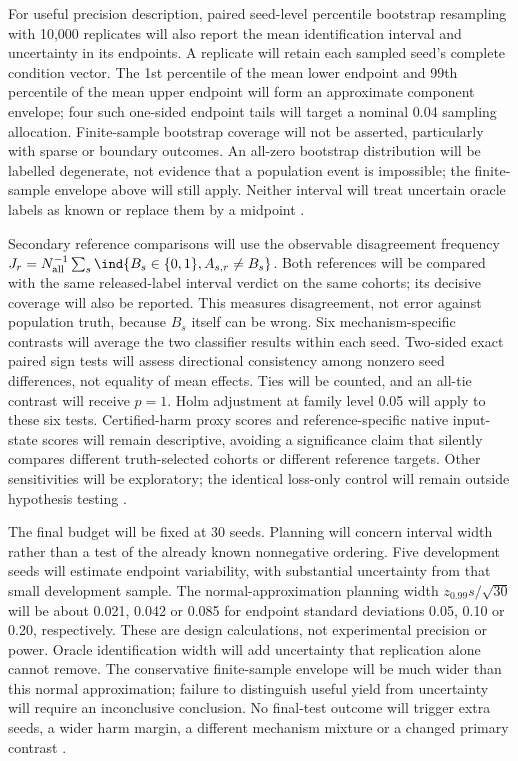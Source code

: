 For useful precision description, paired seed-level percentile bootstrap resampling with 10,000 replicates will also report the mean identification interval and uncertainty in its endpoints. A replicate will retain each sampled seed's complete condition vector. The 1st percentile of the mean lower endpoint and 99th percentile of the mean upper endpoint will form an approximate component envelope; four such one-sided endpoint tails will target a nominal 0.04 sampling allocation. Finite-sample bootstrap coverage will not be asserted, particularly with sparse or boundary outcomes. An all-zero bootstrap distribution will be labelled degenerate, not evidence that a population event is impossible; the finite-sample envelope above will still apply. Neither interval will treat uncertain oracle labels as known or replace them by a midpoint \cite{souza,hoeffding}.

Secondary reference comparisons will use the observable disagreement frequency $J_r=N_{\mathrm{all}}^{-1}\sum_s\ind\{B_s\in\{0,1\},A_{s,r}\ne B_s\}$. Both references will be compared with the same released-label interval verdict on the same cohorts; its decisive coverage will also be reported. This measures disagreement, not error against population truth, because $B_s$ itself can be wrong. Six mechanism-specific contrasts will average the two classifier results within each seed. Two-sided exact paired sign tests will assess directional consistency among nonzero seed differences, not equality of mean effects. Ties will be counted, and an all-tie contrast will receive $p=1$. Holm adjustment at family level 0.05 will apply to these six tests. Certified-harm proxy scores and reference-specific native input-state scores will remain descriptive, avoiding a significance claim that silently compares different truth-selected cohorts or different reference targets. Other sensitivities will be exploratory; the identical loss-only control will remain outside hypothesis testing \cite{holm,cerqueira}.

The final budget will be fixed at 30 seeds. Planning will concern interval width rather than a test of the already known nonnegative ordering. Five development seeds will estimate endpoint variability, with substantial uncertainty from that small development sample. The normal-approximation planning width $z_{0.99}s/\sqrt{30}$ will be about 0.021, 0.042 or 0.085 for endpoint standard deviations 0.05, 0.10 or 0.20, respectively. These are design calculations, not experimental precision or power. Oracle identification width will add uncertainty that replication alone cannot remove. The conservative finite-sample envelope will be much wider than this normal approximation; failure to distinguish useful yield from uncertainty will require an inconclusive conclusion. No final-test outcome will trigger extra seeds, a wider harm margin, a different mechanism mixture or a changed primary contrast \cite{hoeffding,souza}.

